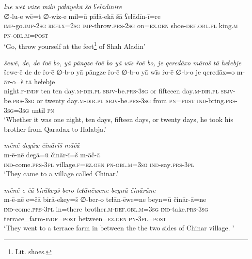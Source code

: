 \ea \label{DG.27}
\textit{lue wēt wize milū pāɫāyekā šā ʕelādīnīre} \\ 
\gll ∅-lu-e wē=t ∅-wiz-e mil=ū pāɫā-ekā šā ʕelādīn-ī=re \\ 
 \textsc{imp-}go.\textsc{imp-}\textsc{2sg} \textsc{reflx}\textsc{=\textsc{2sg}} \textsc{imp-}throw\textsc{.prs}-\textsc{2sg} on\textsc{=ez}\textsc{.gen} shoe\textsc{-def}\textsc{.obl}\textsc{.pl} king\textsc{.m} \textsc{pn}\textsc{-obl}\textsc{.m}\textsc{=\textsc{post}} \\ 
\glt `Go, throw yourself at the feet\footnote{Lit. shoes.} of Shah Aladin'
\z 
 
\ea \label{DG.29}
\textit{šewē, de, de řoē bo, yā pāngze řoē bo yā wīs řoē bo, je qeredāxo māroš tā heɫebje} \\ 
\gll šewe-ē de de řo-ē ∅-b-o yā pāngze řo-ē ∅-b-o yā wīs řo-ē ∅-b-o je qeredāx=o m-ār-o=š tā heɫebje \\ 
 night\textsc{\textsc{.f}}\textsc{-indf} ten ten day\textsc{.m}\textsc{-dir}\textsc{.pl} \textsc{sbjv-}be\textsc{.prs}\textsc{-3sg} or fifteeen day\textsc{.m}\textsc{-dir}\textsc{.pl} \textsc{sbjv-}be\textsc{.prs}\textsc{-3sg} or twenty day\textsc{.m}\textsc{-dir}\textsc{.pl} \textsc{sbjv-}be\textsc{.prs}\textsc{-3sg} from \textsc{pn}\textsc{=\textsc{post}} \textsc{ind-}bring\textsc{.prs}\textsc{-3sg}\textsc{=3sg} until \textsc{pn} \\ 
\glt `Whether it was one night, ten days, fifteen days, or twenty days, he took his brother from Qaradax to Halabja.'
\z 
 
\ea \label{DG.30}
\textit{mēnē degāw činārīš māčā} \\ 
\gll m-ē-nē degā=ū činār-ī=š m-āč-ā \\ 
 \textsc{ind-}come\textsc{.prs}\textsc{-3pl} village\textsc{\textsc{.f}}\textsc{=ez}\textsc{.gen} \textsc{pn}\textsc{-obl}\textsc{.m}\textsc{=3sg} \textsc{ind-}say\textsc{.prs}\textsc{-3pl} \\ 
\glt `They came to a village called Chinar.'
\z 
 
\ea \label{DG.31}
\textit{mēnē e čā birākeyš bero teɫānēwene beynū činārāne} \\ 
\gll m-ē-nē e=čā birā-ekey=š ∅-ber-o teɫān-ēwe=ne beyn=ū činār-ā=ne \\ 
 \textsc{ind-}come\textsc{.prs}\textsc{-3pl} in=there brother\textsc{.m}\textsc{-def}\textsc{.obl}\textsc{.m}\textsc{=3sg} \textsc{ind-}take\textsc{.prs}\textsc{-3sg} terrace\_farm\textsc{-indf}\textsc{=\textsc{post}} between\textsc{=ez}\textsc{.gen} \textsc{pn}\textsc{-3pl}\textsc{=\textsc{post}} \\ 
\glt `They went to a terrace farm in between the the two sides of Chinar village. '
\z 
 
